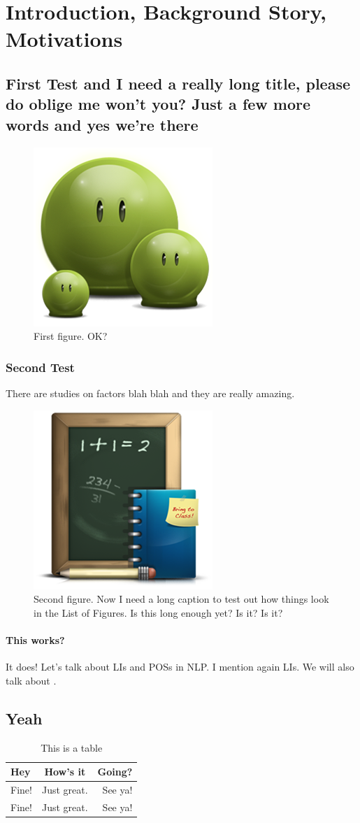 \chapter{Introduction, Background Story, Motivations}
\section{First Test and I need a really long title, please do oblige me won't you? Just a few more words and yes we're there}
\lipsum[1-4]

\begin{figure}[hbt!]\centering
\includegraphics[width=.3\textwidth]{green}
\caption{First figure. OK?}
\end{figure}

\subsection{Second Test}
There are studies on factors blah blah \cite{audibert:2004} and they are really amazing\cite{budanitsky:hirst:2006}.

\begin{figure}[hbt!]\centering
\includegraphics[width=.3\textwidth]{school}
\caption{Second figure. Now I need a long caption to test out how things look in the List of Figures. Is this long enough yet? Is it? Is it?}
\end{figure}

\subsubsection{This works?}
It does! Let's talk about \acp{LI} and \acp{POS} in \ac{NLP}. I mention again \acp{LI}. We will also talk about .

\section{Yeah}
\lipsum[5-6]

\begin{table}[hbt!]
\caption{This is a table}
\centering
\begin{tabular}{ l c r }
\hline
Hey & How's it & Going?\\ \hline
Fine! & Just great. & See ya!\\
Fine! & Just great. & See ya!\\
\hline
\end{tabular}
\end{table}